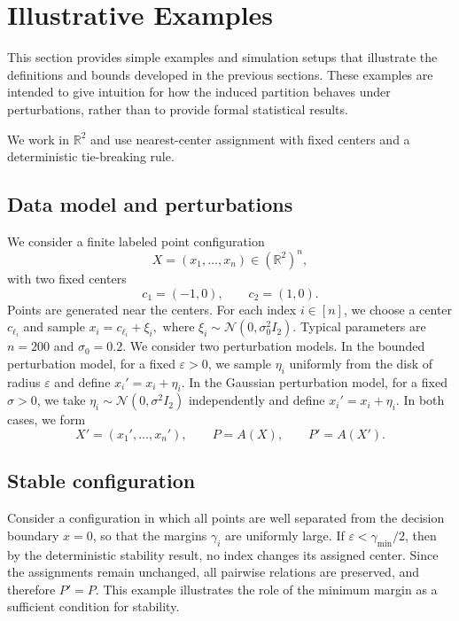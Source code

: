 \documentclass[11pt]{amsart}
\theoremstyle{plain}
\theoremstyle{definition}
\begin{document}
\section{Illustrative Examples}

This section provides simple examples and simulation setups that illustrate the definitions and bounds developed in the previous sections. These examples are intended to give intuition for how the induced partition behaves under perturbations, rather than to provide formal statistical results.

We work in $\mathbb{R}^2$ and use nearest-center assignment with fixed centers and a deterministic tie-breaking rule.

\subsection{Data model and perturbations}

We consider a finite labeled point configuration
\[
X = (x_1, \ldots, x_n) \in (\mathbb{R}^2)^n,
\]
with two fixed centers
\[
c_1 = (-1,0), \qquad c_2 = (1,0).
\]
Points are generated near the centers. For each index $i \in [n]$, we choose a center $c_{\ell_i}$ and sample
$x_i = c_{\ell_i} + \xi_i,$
where $\xi_i \sim \mathcal{N}(0,\sigma_0^2 I_2)$. Typical parameters are $n = 200$ and $\sigma_0 = 0.2$.
We consider two perturbation models. In the bounded perturbation model, for a fixed $\varepsilon > 0$, we sample $\eta_i$ uniformly from the disk of radius $\varepsilon$ and define
$x_i' = x_i + \eta_i.$
In the Gaussian perturbation model, for a fixed $\sigma > 0$, we take
$\eta_i \sim \mathcal{N}(0,\sigma^2 I_2)$
independently and define $x_i' = x_i + \eta_i$. In both cases, we form
\[
X' = (x_1', \ldots, x_n'), \qquad P = A(X), \qquad P' = A(X').
\]

\subsection{Stable configuration}

Consider a configuration in which all points are well separated from the decision boundary $x=0$, so that the margins $\gamma_i$ are uniformly large. If $\varepsilon < \gamma_{\min}/2$, then by the deterministic stability result, no index changes its assigned center. Since the assignments remain unchanged, all pairwise relations are preserved, and therefore
$P' = P.$
This example illustrates the role of the minimum margin as a sufficient condition for stability.
\end{document}
